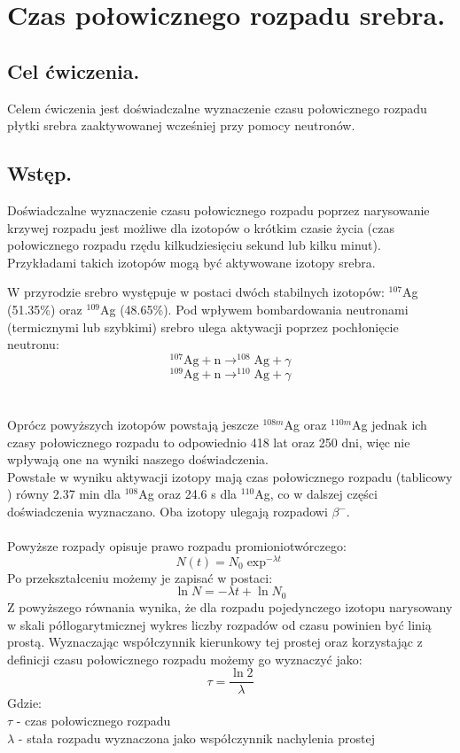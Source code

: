 \documentclass{article}
\begin{document}

\section{Czas połowicznego rozpadu srebra.}
\subsection{Cel ćwiczenia.}
   Celem ćwiczenia jest doświadczalne wyznaczenie czasu połowicznego rozpadu płytki srebra zaaktywowanej wcześniej przy pomocy neutronów.

\subsection{Wstęp.}
Doświadczalne wyznaczenie czasu połowicznego rozpadu poprzez narysowanie krzywej rozpadu jest możliwe dla izotopów o krótkim czasie życia (czas połowicznego rozpadu rzędu kilkudziesięciu sekund lub kilku minut).
Przykładami takich izotopów mogą być aktywowane izotopy srebra.

W przyrodzie srebro występuje w postaci dwóch stabilnych izotopów: $^{107}$Ag (51.35\%) oraz $^{109}$Ag (48.65\%). Pod wpływem bombardowania neutronami (termicznymi lub szybkimi) srebro ulega aktywacji poprzez pochłonięcie neutronu:\\
\[^{107}\text{Ag} + \text{n} \to ^{108}\text{Ag} + \gamma
\]
\[^{109}\text{Ag} + \text{n} \to ^{110}\text{Ag} + \gamma
\]\\\\
Oprócz powyższych izotopów powstają jeszcze $^{108m}$Ag oraz $^{110m}$Ag jednak ich czasy połowicznego rozpadu to odpowiednio 418 lat oraz 250 dni, więc nie wpływają one na wyniki naszego doświadczenia.\\
Powstałe w wyniku aktywacji izotopy mają czas połowicznego rozpadu (tablicowy \cite{1}) równy 2.37 min dla $^{108}$Ag oraz 24.6 s dla $^{110}$Ag, co w dalszej części doświadczenia wyznaczano. Oba izotopy ulegają rozpadowi $\beta ^-$. \\\\
Powyższe rozpady opisuje prawo rozpadu promioniotwórczego:
\begin{equation}
N(t) = N_0 \exp^{-\lambda t}
\end{equation}
Po przekształceniu możemy je zapisać w postaci:
\begin{equation}
\ln N = -\lambda t + \ln N_0
\label{wz_rozpad_log}
\end{equation}
Z powyższego równania wynika, że dla rozpadu pojedynczego izotopu narysowany w skali półlogarytmicznej wykres liczby rozpadów od czasu powinien być linią prostą. Wyznaczając współczynnik kierunkowy tej prostej oraz korzystając z definicji czasu połowicznego rozpadu możemy go wyznaczyć jako:
\begin{equation}
\tau = \frac{\ln 2}{\lambda}
\label{wz_tau}
\end{equation}
Gdzie:\\
$\tau$ - czas połowicznego rozpadu\\
$\lambda $ - stała rozpadu wyznaczona jako współczynnik nachylenia prostej\\
\end{document}
